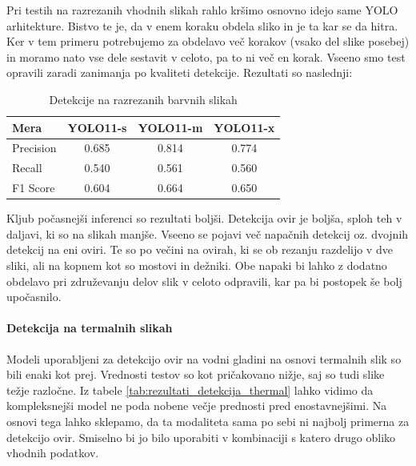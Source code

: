 \documentclass[10pt,twocolumn,letterpaper]{article}
\begin{document}
Pri testih na razrezanih vhodnih slikah rahlo kršimo osnovno idejo same YOLO arhitekture. Bistvo te je, da v enem koraku obdela sliko in je ta kar se da hitra. Ker v tem primeru potrebujemo za obdelavo več korakov (vsako del slike posebej) in moramo nato vse dele sestavit v celoto, pa to ni več en korak. Vseeno smo test opravili zaradi zanimanja po kvaliteti detekcije. Rezultati so naslednji:

\begin{table}[h!]
    \begin{center}
        \begin{tabular}{|l|c|c|c|}
            \hline
                Mera & YOLO11-s & YOLO11-m & YOLO11-x \\
            \hline\hline
                Precision & 0.685 & 0.814 & 0.774 \\
                Recall & 0.540 & 0.561 & 0.560 \\
                F1 Score & 0.604 & 0.664 & 0.650 \\
            \hline
        \end{tabular}
    \end{center}
    \caption{Detekcije na razrezanih barvnih slikah}
    \label{tab:rezultati_detekcija_tile_rgb}
\end{table}

Kljub počasnejši inferenci so rezultati boljši. Detekcija ovir je boljša, sploh teh v daljavi, ki so na slikah manjše. Vseeno se pojavi več napačnih detekcij oz. dvojnih detekcij na eni oviri. Te so po večini na ovirah, ki se ob rezanju razdelijo v dve sliki, ali na kopnem kot so mostovi in dežniki. Obe napaki bi lahko z dodatno obdelavo pri združevanju delov slik v celoto odpravili, kar pa bi postopek še bolj upočasnilo.

\paragraph{Detekcija na termalnih slikah\newline}
Modeli uporabljeni za detekcijo ovir na vodni gladini na osnovi termalnih slik so bili enaki kot prej. Vrednosti testov so kot pričakovano nižje, saj so tudi slike težje razločne. Iz tabele \ref{tab:rezultati_detekcija_thermal} lahko vidimo da kompleksnejši model ne poda nobene večje prednosti pred enostavnejšimi. Na osnovi tega lahko sklepamo, da ta modaliteta sama po sebi ni najbolj primerna za detekcijo ovir. Smiselno bi jo bilo uporabiti v kombinaciji s katero drugo obliko vhodnih podatkov.
\end{document}
